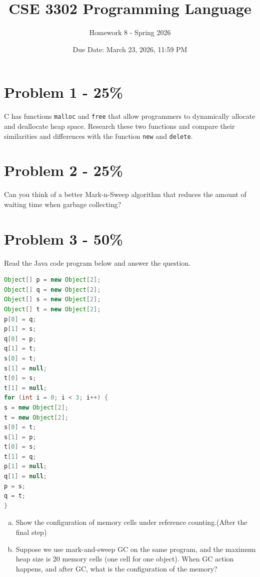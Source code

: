 \documentclass{article}
\begin{document}
\title{CSE 3302 Programming Language}
\author{Homework 8 - Spring 2026}
\date{Due Date: March 23, 2026, 11:59 PM}
\maketitle
\thispagestyle{fancy}


\section*{Problem 1 - 25\%}

C has functions \texttt{malloc} and \texttt{free} that allow programmers to dynamically allocate and deallocate heap space. Research these two functions and compare their similarities and differences with the function \texttt{new} and \texttt{delete}.


\section*{Problem 2 - 25\%}

Can you think of a better Mark-n-Sweep algorithm that reduces the amount of waiting time when garbage collecting?

\section*{Problem 3 - 50\%}

Read the Java code program below and answer the question.
	
\centering
\begin{lstlisting}[language=Java] 
Object[] p = new Object[2];
Object[] q = new Object[2];
Object[] s = new Object[2];
Object[] t = new Object[2];
p[0] = q;
p[1] = s;
q[0] = p;
q[1] = t;
s[0] = t;
s[1] = null;
t[0] = s;
t[1] = null;
for (int i = 0; i < 3; i++) {
s = new Object[2];
t = new Object[2];
s[0] = t;
s[1] = p;
t[0] = s;
t[1] = q;
p[1] = null;
q[1] = null;
p = s;
q = t;
}
\end{lstlisting} 

\begin{enumerate}[(a)]
    \item Show the configuration of memory cells under reference counting.(After the final step)
    \item Suppose we use mark-and-sweep GC on the same program, and the maximum heap
    size is 20 memory cells (one cell for one object). When GC action happens, and after GC, what is the
    configuration of the memory?
\end{enumerate}


\vspace{20pt}
\vspace{0.8em}
\end{document}
